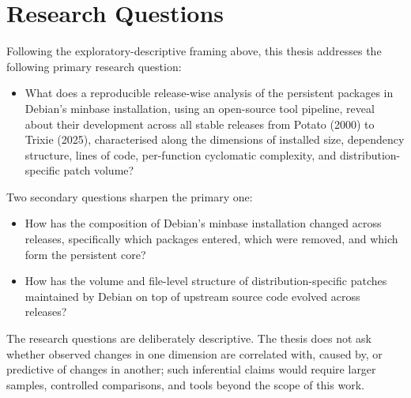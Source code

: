\section*{Research Questions}
Following the exploratory-descriptive framing above, this thesis addresses the following primary research question:

\begin{itemize}
    \item What does a reproducible release-wise analysis of the persistent packages in Debian's minbase installation, using an open-source tool pipeline, reveal about their development across all stable releases from Potato (2000) to Trixie (2025), characterised along the dimensions of installed size, dependency structure, lines of code, per-function cyclomatic complexity, and distribution-specific patch volume?
\end{itemize}

Two secondary questions sharpen the primary one:
\begin{itemize}
    \item How has the composition of Debian's minbase installation changed across releases, specifically which packages entered, which were removed, and which form the persistent core?
    \item How has the volume and file-level structure of distribution-specific patches maintained by Debian on top of upstream source code evolved across releases?
\end{itemize}

The research questions are deliberately descriptive. The thesis does not ask whether observed changes in one dimension are correlated with, caused by, or predictive of changes in another; such inferential claims would require larger samples, controlled comparisons, and tools beyond the scope of this work.

